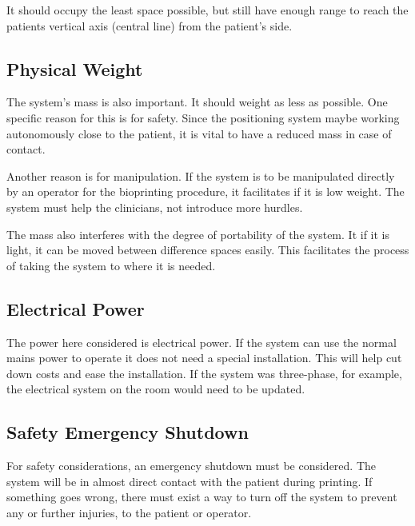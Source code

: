 It should occupy the least space possible, but still have enough range to reach the patients vertical axis (central line) from the patient's side.


\subsection{Physical Weight}
\label{subsec:system_architecture_requirements_physical_mass}

The system's mass is also important. It should weight as less as possible. One specific reason for this is for safety. Since the positioning system maybe working autonomously close to the patient, it is vital to have a reduced mass in case of contact. 

Another reason is for manipulation. If the system is to be manipulated directly by an operator for the bioprinting procedure, it facilitates if it is low weight. The system must help the clinicians, not introduce more hurdles.

The mass also interferes with the degree of portability of the system. It if it is light, it can be moved between difference spaces easily. This facilitates the process of taking the system to where it is needed.


\subsection{Electrical Power}
\label{subsec:system_architecture_requirements_physical_power}

The power here considered is electrical power. If the system can use the normal mains power to operate it does not need a special installation. This will help cut down costs and ease the installation. If the system was three-phase, for example, the electrical system on the room would need to be updated.


\subsection{Safety Emergency Shutdown}
\label{subsec:system_architecture_requirements_safety_emergency_shutdown}

For safety considerations, an emergency shutdown must be considered. The system will be in almost direct contact with the patient during printing. If something goes wrong, there must exist a way to turn off the system to prevent any or further injuries, to the patient or operator.

